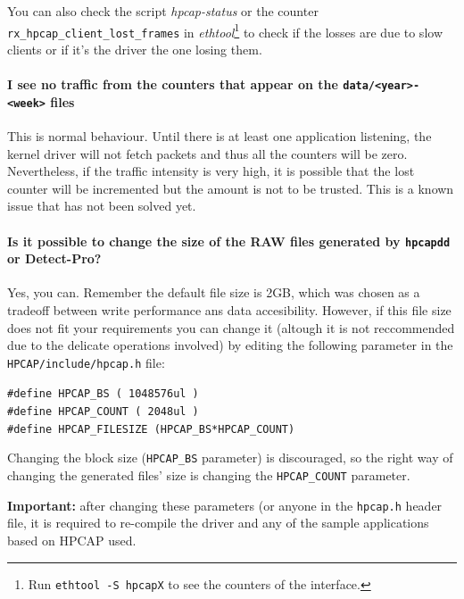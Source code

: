 \documentclass[a4paper,oneside]{hpman}
\begin{document}
    You can also check the script \textit{hpcap-status} or the counter \texttt{rx\_hpcap\_client\_lost\_frames} in \textit{ethtool}\footnote{Run \texttt{ethtool -S hpcapX} to see the counters of the interface.} to check if the losses are due to slow clients or if it's the driver the one losing them.

\paragraph{I see no traffic from the counters that appear on the \texttt{data/<year>-<week>} files}
    This is normal behaviour. Until there is at least one application listening, the kernel driver will not fetch packets and thus all the counters will be zero. Nevertheless, if the traffic intensity is very high, it is possible that the lost counter will be incremented but the amount is not to be trusted. This is a known issue that has not been solved yet.


\paragraph{Is it possible to change the size of the RAW files generated by \texttt{hpcapdd} or Detect-Pro?}
    Yes, you can. Remember the default file size is 2GB, which was chosen as a tradeoff between  write performance ans data accesibility.
    However, if this file size does not fit your requirements you can change it (altough it is not reccommended due to the delicate operations involved) by editing the following parameter in the \texttt{HPCAP/include/hpcap.h} file:

        \begin{center}
            \texttt{\#define HPCAP\_BS ( 1048576ul )}\\
            \texttt{\#define HPCAP\_COUNT ( 2048ul )}\\
            \texttt{\#define HPCAP\_FILESIZE (HPCAP\_BS*HPCAP\_COUNT)}\\
        \end{center}

    Changing the block size (\texttt{HPCAP\_BS} parameter) is discouraged, so the right way of changing the generated files' size is changing the \texttt{HPCAP\_COUNT} parameter.

    \textbf{Important:} after changing these parameters (or anyone in the \texttt{hpcap.h} header file, it is required to re-compile the driver and any of the sample applications based on HPCAP used.
\end{document}
